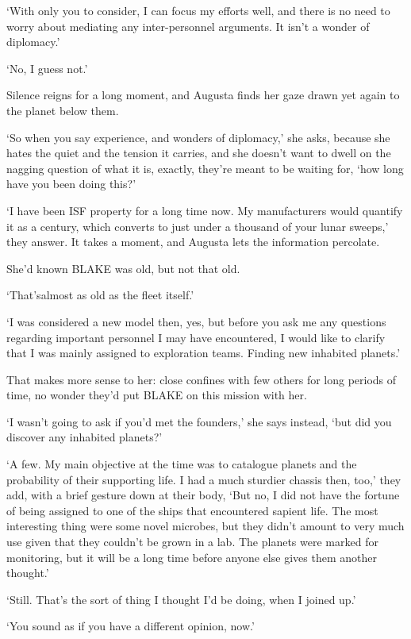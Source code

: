 `With only you to consider, I can focus my efforts well, and there is
no need to worry about mediating any inter-personnel arguments. It
isn't a wonder of diplomacy.'

`No, I guess not.'

Silence reigns for a long moment, and Augusta finds her gaze drawn yet
again to the planet below them.

`So when you say experience, and wonders of diplomacy,' she asks,
because she hates the quiet and the tension it carries, and she
doesn't want to dwell on the nagging question of what it is, exactly,
they're meant to be waiting for, `how long have you been doing this?'

`I have been ISF property for a long time now. My manufacturers would
quantify it as a century, which converts to just under a thousand of
your lunar sweeps,' they answer. It takes a moment, and Augusta lets
the information percolate.

She'd known BLAKE was old, but not that old.

`That's\textellipsis almost as old as the fleet itself.'

`I was considered a new model then, yes, but before you ask me any
questions regarding important personnel I may have encountered, I
would like to clarify that I was mainly assigned to exploration
teams. Finding new inhabited planets.'

That makes more sense to her: close confines with few others for long
periods of time, no wonder they'd put BLAKE on this mission with her.

`I wasn't going to ask if you'd met the founders,' she says instead,
`but did you discover any inhabited planets?'

`A few. My main objective at the time was to catalogue planets and the
probability of their supporting life. I had a much sturdier chassis
then, too,' they add, with a brief gesture down at their body, `But
no, I did not have the fortune of being assigned to one of the ships
that encountered sapient life. The most interesting thing were some
novel microbes, but they didn't amount to very much use given that
they couldn't be grown in a lab. The planets were marked for
monitoring, but it will be a long time before anyone else gives them
another thought.'

`Still. That's the sort of thing I thought I'd be doing, when I joined
up.'

`You sound as if you have a different opinion, now.'

